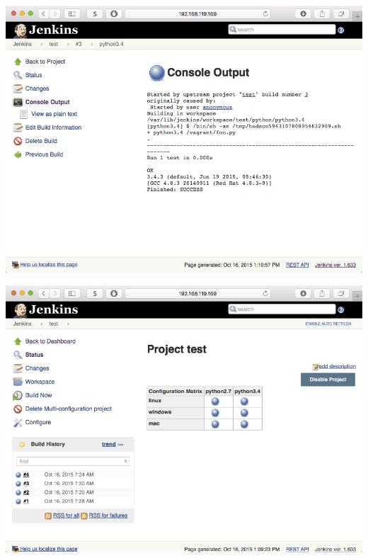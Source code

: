 \documentclass[xcolor=svgnames,17pt]{beamer}
\begin{document}
\begin{frame}[plain]{}
\includegraphics[width=\paperwidth,frame,center]{hello-7-output-2.png}
\end{frame}

\begin{frame}[plain]{}
\includegraphics[width=\paperwidth,frame,center]{hello-8-matrix.png}
\end{frame}
\end{document}
